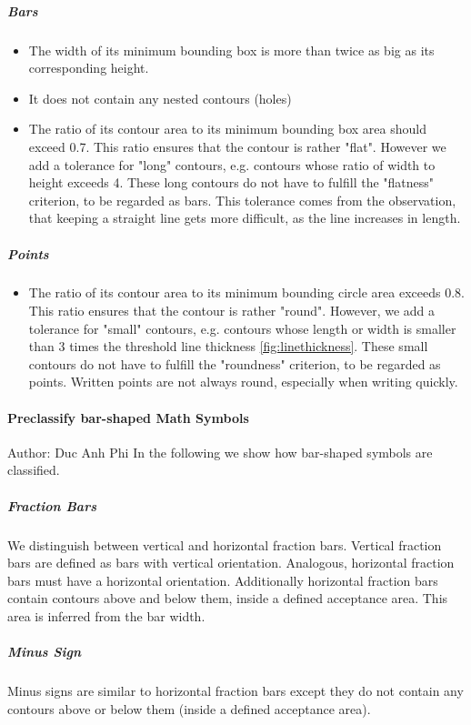 \documentclass[12pt]{article}
\begin{document}
	\subparagraph{Bars}\label{bars}
	\begin{itemize}
		\item The width of its minimum bounding box is more than twice as big as its corresponding height.
		\item It does not contain any nested contours (holes)
		\item The ratio of its contour area to its minimum bounding box area should exceed 0.7. This ratio ensures that the contour is rather "flat". However we add a tolerance for "long" contours, e.g. contours whose ratio of width to height exceeds 4. These long contours do not have to fulfill the "flatness" criterion, to be regarded as bars. This tolerance comes from the observation, that keeping a straight line gets more difficult, as the line increases in length. 
	\end{itemize}

	\subparagraph{Points}
	\begin{itemize}
		\item The ratio of its contour area to its minimum bounding circle area exceeds 0.8. This ratio ensures that the contour is rather "round". However, we add a tolerance for "small" contours, e.g. contours whose length or width is smaller than 3 times the threshold line thickness \ref{fig:linethickness}. These small contours do not have to fulfill the "roundness" criterion, to be regarded as points. Written points are not always round, especially when writing quickly.
	\end{itemize}

	\paragraph{Preclassify bar-shaped Math Symbols}
	\small{Author: Duc Anh Phi} \newline \newline
	In the following we show how bar-shaped symbols are classified.
	\subparagraph{Fraction Bars}\label{fractionbar}
	We distinguish between vertical and horizontal fraction bars.
	Vertical fraction bars are defined as bars with vertical orientation. Analogous, horizontal fraction bars must have a horizontal orientation. Additionally horizontal fraction bars contain contours above and below them, inside a defined acceptance area. This area is inferred from the bar width.
	
	\subparagraph{Minus Sign}
	Minus signs are similar to horizontal fraction bars except they do not contain any contours above or below them (inside a defined acceptance area).
\end{document}
